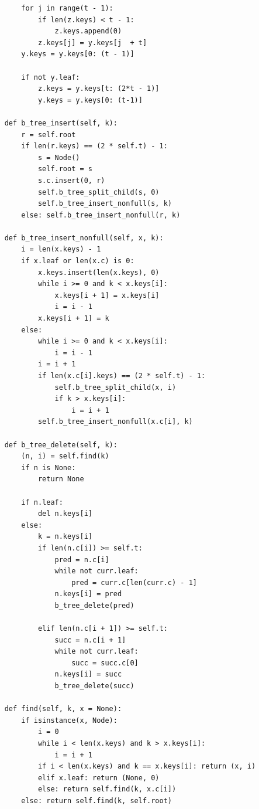 \documentclass{article}
\begin{document}
\begin{enumerate}
\begin{enumerate}
\begin{lstlisting}
        for j in range(t - 1):
            if len(z.keys) < t - 1:
                z.keys.append(0)
            z.keys[j] = y.keys[j  + t]
        y.keys = y.keys[0: (t - 1)]
        
        if not y.leaf:
            z.keys = y.keys[t: (2*t - 1)]
            y.keys = y.keys[0: (t-1)]

    def b_tree_insert(self, k):
        r = self.root
        if len(r.keys) == (2 * self.t) - 1:
            s = Node()
            self.root = s
            s.c.insert(0, r)
            self.b_tree_split_child(s, 0)  
            self.b_tree_insert_nonfull(s, k)
        else: self.b_tree_insert_nonfull(r, k)
    
    def b_tree_insert_nonfull(self, x, k):
        i = len(x.keys) - 1
        if x.leaf or len(x.c) is 0:
            x.keys.insert(len(x.keys), 0)
            while i >= 0 and k < x.keys[i]:
                x.keys[i + 1] = x.keys[i]
                i = i - 1
            x.keys[i + 1] = k
        else: 
            while i >= 0 and k < x.keys[i]:
                i = i - 1            
            i = i + 1
            if len(x.c[i].keys) == (2 * self.t) - 1:
                self.b_tree_split_child(x, i)
                if k > x.keys[i]:
                    i = i + 1
            self.b_tree_insert_nonfull(x.c[i], k) 
    
    def b_tree_delete(self, k):
        (n, i) = self.find(k)
        if n is None:
            return None
        
        if n.leaf:
            del n.keys[i]
        else:
            k = n.keys[i]
            if len(n.c[i]) >= self.t:
                pred = n.c[i]
                while not curr.leaf:
                    pred = curr.c[len(curr.c) - 1]
                n.keys[i] = pred
                b_tree_delete(pred)
                
            elif len(n.c[i + 1]) >= self.t:
                succ = n.c[i + 1]
                while not curr.leaf:
                    succ = succ.c[0]
                n.keys[i] = succ
                b_tree_delete(succ)
    
    def find(self, k, x = None):
        if isinstance(x, Node):
            i = 0            
            while i < len(x.keys) and k > x.keys[i]:
                i = i + 1
            if i < len(x.keys) and k == x.keys[i]: return (x, i)
            elif x.leaf: return (None, 0)
            else: return self.find(k, x.c[i])
        else: return self.find(k, self.root)
    

\end{lstlisting}
\end{enumerate}
\end{enumerate}
\end{document}
